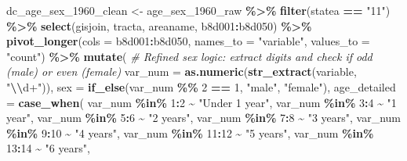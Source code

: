\documentclass[
]{article}
\newenvironment{Shaded}{\begin{snugshade}}{\end{snugshade}}
\newcommand{\AttributeTok}[1]{\textcolor[rgb]{0.13,0.29,0.53}{#1}}
\newcommand{\CommentTok}[1]{\textcolor[rgb]{0.56,0.35,0.01}{\textit{#1}}}
\newcommand{\DecValTok}[1]{\textcolor[rgb]{0.00,0.00,0.81}{#1}}
\newcommand{\FunctionTok}[1]{\textcolor[rgb]{0.13,0.29,0.53}{\textbf{#1}}}
\newcommand{\NormalTok}[1]{#1}
\newcommand{\OtherTok}[1]{\textcolor[rgb]{0.56,0.35,0.01}{#1}}
\newcommand{\SpecialCharTok}[1]{\textcolor[rgb]{0.81,0.36,0.00}{\textbf{#1}}}
\newcommand{\StringTok}[1]{\textcolor[rgb]{0.31,0.60,0.02}{#1}}
\begin{document}
\begin{Shaded}
\begin{Highlighting}[]
\NormalTok{dc\_age\_sex\_1960\_clean }\OtherTok{\textless{}{-}}\NormalTok{ age\_sex\_1960\_raw }\SpecialCharTok{\%\textgreater{}\%}
  \FunctionTok{filter}\NormalTok{(statea }\SpecialCharTok{==} \StringTok{"11"}\NormalTok{) }\SpecialCharTok{\%\textgreater{}\%}
  \FunctionTok{select}\NormalTok{(gisjoin, tracta, areaname, b8d001}\SpecialCharTok{:}\NormalTok{b8d050) }\SpecialCharTok{\%\textgreater{}\%}
  \FunctionTok{pivot\_longer}\NormalTok{(}\AttributeTok{cols =}\NormalTok{ b8d001}\SpecialCharTok{:}\NormalTok{b8d050, }\AttributeTok{names\_to =} \StringTok{"variable"}\NormalTok{, }\AttributeTok{values\_to =} \StringTok{"count"}\NormalTok{) }\SpecialCharTok{\%\textgreater{}\%}
  \FunctionTok{mutate}\NormalTok{(}
    \CommentTok{\# Refined sex logic: extract digits and check if odd (male) or even (female)}
    \AttributeTok{var\_num =} \FunctionTok{as.numeric}\NormalTok{(}\FunctionTok{str\_extract}\NormalTok{(variable, }\StringTok{"}\SpecialCharTok{\textbackslash{}\textbackslash{}}\StringTok{d+"}\NormalTok{)),}
    \AttributeTok{sex =} \FunctionTok{if\_else}\NormalTok{(var\_num }\SpecialCharTok{\%\%} \DecValTok{2} \SpecialCharTok{==} \DecValTok{1}\NormalTok{, }\StringTok{"male"}\NormalTok{, }\StringTok{"female"}\NormalTok{),}
    \AttributeTok{age\_detailed =} \FunctionTok{case\_when}\NormalTok{(}
\NormalTok{      var\_num }\SpecialCharTok{\%in\%} \DecValTok{1}\SpecialCharTok{:}\DecValTok{2} \SpecialCharTok{\textasciitilde{}} \StringTok{"Under 1 year"}\NormalTok{,}
\NormalTok{      var\_num }\SpecialCharTok{\%in\%} \DecValTok{3}\SpecialCharTok{:}\DecValTok{4} \SpecialCharTok{\textasciitilde{}} \StringTok{"1 year"}\NormalTok{,}
\NormalTok{      var\_num }\SpecialCharTok{\%in\%} \DecValTok{5}\SpecialCharTok{:}\DecValTok{6} \SpecialCharTok{\textasciitilde{}} \StringTok{"2 years"}\NormalTok{,}
\NormalTok{      var\_num }\SpecialCharTok{\%in\%} \DecValTok{7}\SpecialCharTok{:}\DecValTok{8} \SpecialCharTok{\textasciitilde{}} \StringTok{"3 years"}\NormalTok{,}
\NormalTok{      var\_num }\SpecialCharTok{\%in\%} \DecValTok{9}\SpecialCharTok{:}\DecValTok{10} \SpecialCharTok{\textasciitilde{}} \StringTok{"4 years"}\NormalTok{,}
\NormalTok{      var\_num }\SpecialCharTok{\%in\%} \DecValTok{11}\SpecialCharTok{:}\DecValTok{12} \SpecialCharTok{\textasciitilde{}} \StringTok{"5 years"}\NormalTok{,}
\NormalTok{      var\_num }\SpecialCharTok{\%in\%} \DecValTok{13}\SpecialCharTok{:}\DecValTok{14} \SpecialCharTok{\textasciitilde{}} \StringTok{"6 years"}\NormalTok{,}

\end{Highlighting}
\end{Shaded}
\end{document}
